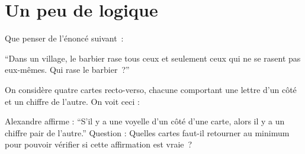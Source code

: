\documentclass[a4paper,12pt]{article}
\begin{document}
\section{Un peu de logique}
\begin{activite}
	\tcblower
	Que penser de l'énoncé suivant~:
\begin{center}
	\enquote{Dans un village, le barbier rase tous ceux et seulement ceux qui ne se rasent pas eux-mêmes. Qui rase le barbier~?}
\end{center}
\end{activite}
\begin{activite}
	\tcblower
On considère quatre cartes recto-verso, chacune comportant une lettre d'un côté et un chiffre de l'autre. On voit ceci :

\begin{center}	
\end{center}
Alexandre affirme : \enquote{S'il y a une voyelle d'un côté d'une carte, alors il y a un chiffre pair de l'autre.}
Question : Quelles cartes faut-il retourner au minimum pour pouvoir vérifier si cette affirmation est vraie~?
\end{activite}
\end{document}
